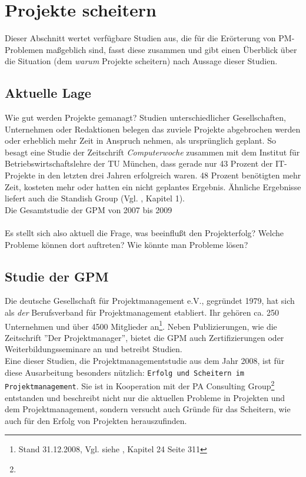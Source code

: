 \documentclass[12pt]{scrartcl}
\begin{document}
\pagebreak
\section{Projekte scheitern}
\label{projekte_scheitern}
Dieser Abschnitt wertet verfügbare Studien aus, die für die Erörterung von PM-Problemen maßgeblich sind, fasst diese zusammen und gibt einen Überblick über die Situation (dem \textit{warum} Projekte scheitern) nach Aussage dieser Studien. 

\subsection{Aktuelle Lage}

Wie gut werden Projekte gemanagt? Studien unterschiedlicher Gesellschaften, Unternehmen oder Redaktionen belegen das zuviele Projekte abgebrochen werden oder erheblich mehr Zeit in Anspruch nehmen, als ursprünglich geplant. So besagt eine Studie der Zeitschrift \textit{Computerwoche} zusammen mit dem Institut für Betriebswirtschaftslehre der TU München, dass gerade nur 43 Prozent der IT-Projekte in den letzten drei Jahren erfolgreich waren. 48 Prozent benötigten mehr Zeit, kosteten mehr oder hatten ein nicht geplantes Ergebnis. Ähnliche Ergebnisse liefert auch die Standish Group (Vgl. \cite{profPM}, Kapitel 1). \\
Die Gesamtstudie der GPM von 2007 bis 2009 \\
\\
Es stellt sich also aktuell die Frage, was beeinflußt den Projekterfolg? Welche Probleme können dort auftreten? Wie könnte man Probleme lösen?

\subsection{Studie der GPM}
\label{studies_gpm}

Die deutsche Gesellschaft für Projektmanagement e.V., gegründet 1979, hat sich als \textit{der} Berufsverband für Projektmanagement etabliert. Ihr gehören ca. 250 Unternehmen und  über 4500 Mitglieder an\footnote{Stand 31.12.2008, Vgl. siehe \cite{proj_zum_erfolg_fuehren}, Kapitel 24 Seite 311}. Neben Publizierungen, wie die Zeitschrift ''Der Projektmanager'', bietet die GPM auch Zertifizierungen oder Weiterbildungsseminare an und betreibt Studien. \\
Eine dieser Studien, die Projektmanagementstudie aus dem Jahr 2008, ist für diese Ausarbeitung besonders nützlich: \texttt{Erfolg und Scheitern im Projektmanagement}. Sie ist in Kooperation mit der PA Consulting Group\footnote{} entstanden und beschreibt nicht nur die aktuellen Probleme in Projekten und dem Projektmanagement, sondern versucht auch Gründe für das Scheitern, wie auch für den Erfolg von Projekten herauszufinden. 
\end{document}
